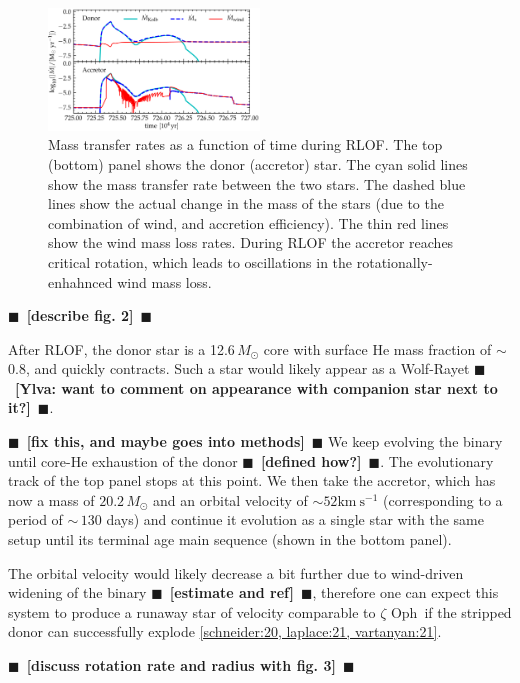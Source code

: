 \documentclass[twocolumn,twocolappendix,trackchanges]{aastex63}
\newcommand{\kms}{{\mathrm{km\ s^{-1}}}}
\newcommand{\zoph}{$\zeta$ Oph}
\newcommand{\todo}[1]{{\large $\blacksquare$~\textbf{\color{red}[#1]}}~$\blacksquare$}
\begin{document}
\begin{figure}[htbp]
  \includegraphics[width=0.5\textwidth]{MT}
  \caption{Mass transfer rates as a function of time during RLOF. The top (bottom) panel
    shows the donor (accretor) star. The cyan solid lines show the
    mass transfer rate between the two stars. The dashed blue lines
    show the actual change in the mass of the stars (due to the
    combination of wind, and accretion efficiency). The thin red
    lines show the wind mass loss rates. During RLOF the accretor
    reaches critical rotation, which leads to oscillations in the
    rotationally-enhahnced wind mass loss.}
  \label{fig:MT}
\end{figure}


\todo{describe fig. 2}

After RLOF, the donor star is a 12.6$\,M_\odot$ core with surface He
mass fraction of $\sim$0.8, and quickly contracts. Such a star would
likely appear as a Wolf-Rayet \todo{Ylva: want to comment on
  appearance with companion star next to it?}.

\todo{fix this, and maybe goes into methods}
We keep evolving the
binary until core-He exhaustion of the donor \todo{defined how?}. The
evolutionary track of the top panel stops at this point.  We then take
the accretor, which has now a mass of $20.2\,M_\odot$ and an orbital
velocity of $\sim 52\kms$ (corresponding to a period of $\sim\,130$
days) and continue it evolution as a single star
with the same setup until its terminal age main sequence (shown in the
bottom panel).

The orbital velocity would likely decrease a bit further due to
wind-driven widening of the binary \todo{estimate and ref}, therefore
one can expect this system to produce a runaway star of velocity
comparable to \zoph\ if the stripped donor can successfully explode
\ref{schneider:20, laplace:21, vartanyan:21}.

\todo{discuss rotation rate and radius with fig. 3}
\end{document}
